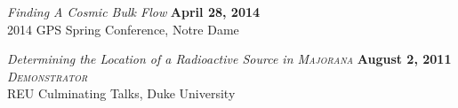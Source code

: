 \documentclass[margin]{res}
\begin{document}
\begin{resume}
{\sl Finding A Cosmic Bulk Flow} \hfill {\bf April 28, 2014}\\
2014 GPS Spring Conference, Notre Dame 

{\sl Determining the Location of a Radioactive Source in \textsc{Majorana}} \hfill {\bf August 2, 2011} \\
{\sl\textsc{Demonstrator}} \\
REU Culminating Talks,
Duke University %








\end{resume}
\end{document}
